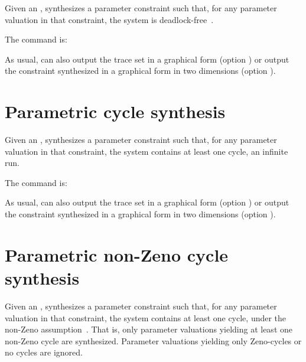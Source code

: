 Given an \NIPTA{}, \PDFC{} synthesizes a parameter constraint such that, for any parameter valuation in that constraint, the system is deadlock-free~\cite{Andre16}.

The command is:


As usual, \imitator{} can also
	output the trace set in a graphical form (option )
	or
	output the constraint synthesized in a graphical form in two dimensions (option ).


\section{Parametric cycle synthesis}\label{ss:mode:LoopSynth}

Given an \NIPTA{}, \imitator{} synthesizes a parameter constraint such that, for any parameter valuation in that constraint, the system contains at least one cycle, \ie{} an infinite run. %

The command is:


As usual, \imitator{} can also
	output the trace set in a graphical form (option )
	or
	output the constraint synthesized in a graphical form in two dimensions (option ).



\section{Parametric non-Zeno cycle synthesis}\label{ss:mode:Zeno}

Given an \NIPTA{}, \imitator{} synthesizes a parameter constraint such that, for any parameter valuation in that constraint, the system contains at least one cycle, under the non-Zeno assumption~\cite{ANPS17}.
That is, only parameter valuations yielding at least one non-Zeno cycle are synthesized.
Parameter valuations yielding only Zeno-cycles or no cycles are ignored.

